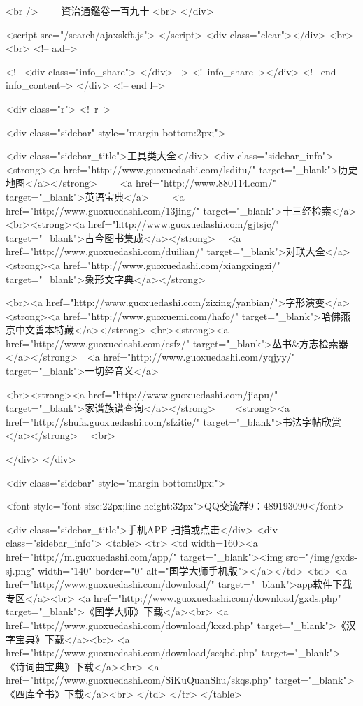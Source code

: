 <br />
　　資治通鑑卷一百九十  <br>
   </div> 

<script src="/search/ajaxskft.js"> </script>
 <div class="clear"></div>
<br>
<br>
 <!-- a.d-->

 <!--
<div class="info_share">
</div> 
-->
 <!--info_share--></div>   <!-- end info_content-->
  </div> <!-- end l-->

<div class="r">   <!--r-->



<div class="sidebar"  style="margin-bottom:2px;">

 
<div class="sidebar_title">工具类大全</div>
<div class="sidebar_info">
<strong><a href="http://www.guoxuedashi.com/lsditu/" target="_blank">历史地图</a></strong>　　
<a href="http://www.880114.com/" target="_blank">英语宝典</a>　　
<a href="http://www.guoxuedashi.com/13jing/" target="_blank">十三经检索</a>　
<br><strong><a href="http://www.guoxuedashi.com/gjtsjc/" target="_blank">古今图书集成</a></strong>　
<a href="http://www.guoxuedashi.com/duilian/" target="_blank">对联大全</a>　<strong><a href="http://www.guoxuedashi.com/xiangxingzi/" target="_blank">象形文字典</a></strong>　

<br><a href="http://www.guoxuedashi.com/zixing/yanbian/">字形演变</a>　　<strong><a href="http://www.guoxuemi.com/hafo/" target="_blank">哈佛燕京中文善本特藏</a></strong>
<br><strong><a href="http://www.guoxuedashi.com/csfz/" target="_blank">丛书&方志检索器</a></strong>　<a href="http://www.guoxuedashi.com/yqjyy/" target="_blank">一切经音义</a>　　

<br><strong><a href="http://www.guoxuedashi.com/jiapu/" target="_blank">家谱族谱查询</a></strong>　　<strong><a href="http://shufa.guoxuedashi.com/sfzitie/" target="_blank">书法字帖欣赏</a></strong>　
<br>

</div>
</div>


<div class="sidebar" style="margin-bottom:0px;">

<font style="font-size:22px;line-height:32px">QQ交流群9：489193090</font>


<div class="sidebar_title">手机APP 扫描或点击</div>
<div class="sidebar_info">
<table>
<tr>
	<td width=160><a href="http://m.guoxuedashi.com/app/" target="_blank"><img src="/img/gxds-sj.png" width="140"  border="0" alt="国学大师手机版"></a></td>
	<td>
<a href="http://www.guoxuedashi.com/download/" target="_blank">app软件下载专区</a><br>
<a href="http://www.guoxuedashi.com/download/gxds.php" target="_blank">《国学大师》下载</a><br>
<a href="http://www.guoxuedashi.com/download/kxzd.php" target="_blank">《汉字宝典》下载</a><br>
<a href="http://www.guoxuedashi.com/download/scqbd.php" target="_blank">《诗词曲宝典》下载</a><br>
<a href="http://www.guoxuedashi.com/SiKuQuanShu/skqs.php" target="_blank">《四库全书》下载</a><br>
</td>
</tr>
</table>

